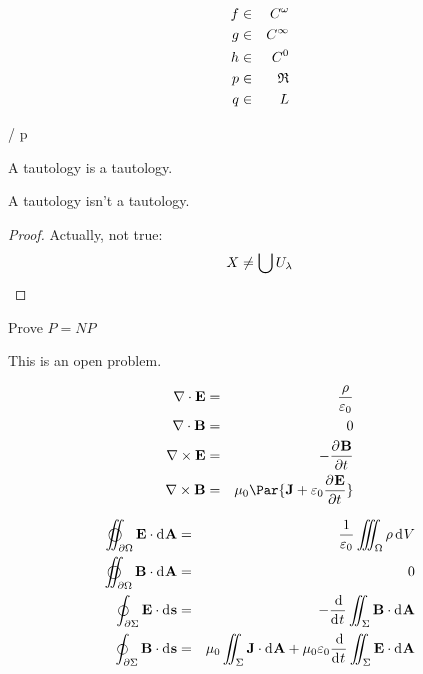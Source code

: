 \documentclass[11pt]{article}
\begin{document}
\begin{eqnarray*}
    f &\in& \cnt^\om \\
    g &\in& \cnt^\infty \\
    h &\in& \cnt^0 \\
    p &\in& \rie \\ 
    q &\in& \lbe
\end{eqnarray*}

\begin{center}
     \into \tp{\ae} / \blank p
\end{center}

\begin{thm}
    A tautology is a tautology.    
\end{thm}

\begin{thm*}
    A tautology isn't a tautology.    
\end{thm*}
\begin{proof}
    Actually, not true:
    \[
        X \neq \bigcup \CU_\la
    \]
\end{proof}

\begin{exercise}
    Prove $P = NP$
\end{exercise}
\begin{solution}
    This is an open problem.
\end{solution}

\usevec

\begin{eqnarray*}
    \Dive\vE &=& \frac{\rho}{\ep_0} \\
    \Dive\vB &=& 0 \\
    \Curl\vE &=& -\pd{\vB}{t} \\
    \Curl\vB &=& \mu_0\Par{\vJ + \ep_0\pd{\vE}{t}}
\end{eqnarray*}

\useveca

\begin{eqnarray*}
    \varoiint_{\del\Om} \vE\cdot\D\vA &=& \frac{1}{\ep_0} \iiint_\Om \rho\D V \\
    \varoiint_{\del\Om} \vB\cdot\D\vA &=& 0 \\
    \oint_{\del\Si} \vE\cdot\D \vs &=& -\od{}{t}\iint_\Si \vB\cdot\D\vA \\
    \oint_{\del\Si} \vB\cdot\D \vs &=& 
        \mu_0\iint_\Si\vJ\cdot\D\vA + \mu_0\ep_0\od{}{t}\iint_\Si\vE\cdot\D\vA 
\end{eqnarray*}
\end{document}

